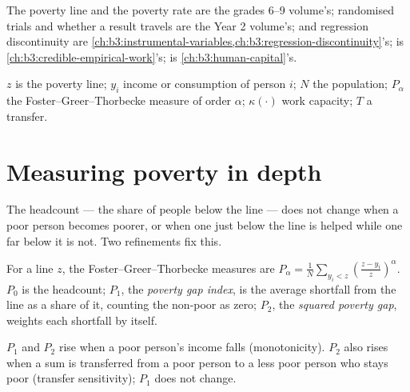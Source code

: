 \begin{recall}
The poverty line and the poverty rate are the grades 6--9 volume's; randomised trials
and whether a result travels are the Year 2 volume's;  and
regression discontinuity are \cref{ch:b3:instrumental-variables,ch:b3:regression-discontinuity}'s;
 is \cref{ch:b3:credible-empirical-work}'s;  is
\cref{ch:b3:human-capital}'s.
\end{recall}

\begin{notation}\label{not:b3:development-microeconomics:symbols}
$z$ is the poverty line; $y_i$ income or consumption of person $i$; $N$ the population; $P_\alpha$ the
Foster--Greer--Thorbecke measure of order $\alpha$; $\kappa(\cdot)$ work capacity; $T$ a transfer.
\end{notation}

\section{Measuring poverty in depth}\label{sec:b3:development-microeconomics:measuring}

The headcount --- the share of people below the line --- does not change when a
poor person becomes poorer, or when one just below the line is helped while one far
below it is not. Two refinements fix this.

\begin{definition}\label{def:b3:development-microeconomics:fgt}
For a line $z$, the Foster--Greer--Thorbecke measures are $P_\alpha = \frac1N\sum_{y_i < z}\left(\frac{z - y_i}{z}\right)^{\alpha}$. $P_0$ is the headcount; $P_1$, the
\emph{poverty gap index}, is the average shortfall from the line as a share of it,
counting the non-poor as zero; $P_2$, the \emph{squared poverty gap}, weights each
shortfall by itself. %
\end{definition}

\begin{proposition}\label{prop:b3:development-microeconomics:fgt}
$P_1$ and $P_2$ rise when a poor person's income falls (monotonicity). $P_2$ also rises
when a sum is transferred from a poor person to a less poor person who stays poor
(transfer sensitivity); $P_1$ does not change.
\end{proposition}

